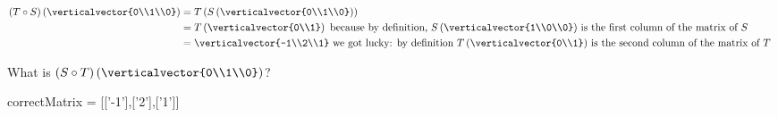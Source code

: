 \documentclass{ximera}
\begin{document}
\begin{question}
\begin{solution}
\begin{hint}
\begin{question}
	\end{question}
	\begin{question}
		\begin{solution}
		\begin{hint}
			\begin{align*}
				(T \circ S)\left(\verticalvector{0\\1\\0}\right) &= T\left(S\left(\verticalvector{0\\1\\0}\right)\right)\\
				&= T\left(\verticalvector{0\\1}\right) \text{ because by definition, $S\left(\verticalvector{1\\0\\0}\right)$ is the first column of the matrix of $S$}\\
				&=\verticalvector{-1\\2\\1} \text{ we got lucky: by definition $T\left(\verticalvector{0\\1}\right)$ is the second column of the matrix of $T$ }\\
			\end{align*}
		\end{hint}
		What is  $(S \circ T)\left(\verticalvector{0\\1\\0}\right)$?
			\begin{matrix-answer}[name=M]
 			   correctMatrix = [['-1'],['2'],['1']]
 			 \end{matrix-answer}
		\end{solution}
		

\end{question}
\end{hint}
\end{solution}
\end{question}
\end{document}
